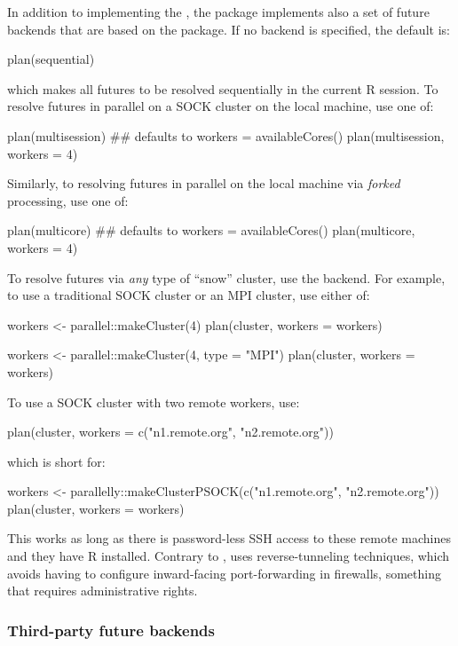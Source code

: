 In addition to implementing the , the  package
implements also a set of future backends that are based on
the  package.  If no backend is specified, the default
is:
\begin{example}
plan(sequential)
\end{example}
which makes all futures to be resolved sequentially in the current R
session.
%
To resolve futures in parallel on a SOCK cluster on the local machine,
use one of:
\begin{example}
plan(multisession) ## defaults to workers = availableCores()
plan(multisession, workers = 4)
\end{example}
%
Similarly, to resolving futures in parallel on the local machine via
\emph{forked} processing, use one of:
\begin{example}
plan(multicore) ## defaults to workers = availableCores()
plan(multicore, workers = 4)
\end{example}
%
To resolve futures via \emph{any} type of ``snow'' cluster, use
the  backend.  For example, to use a traditional SOCK
cluster or an MPI cluster, use either of:
\begin{example}
workers <- parallel::makeCluster(4)
plan(cluster, workers = workers)

workers <- parallel::makeCluster(4, type = "MPI")
plan(cluster, workers = workers)
\end{example}
To use a SOCK cluster with two remote workers, use:
\begin{example}
plan(cluster, workers = c("n1.remote.org", "n2.remote.org"))
\end{example}
which is short for:
\begin{example}
workers <- parallelly::makeClusterPSOCK(c("n1.remote.org", "n2.remote.org"))
plan(cluster, workers = workers)
\end{example}
This works as long as there is password-less SSH access to these
remote machines and they have R installed.  Contrary to
,
 uses reverse-tunneling
techniques, which avoids having to configure inward-facing
port-forwarding in firewalls, something that requires administrative
rights.


\subsubsection{Third-party future backends}

